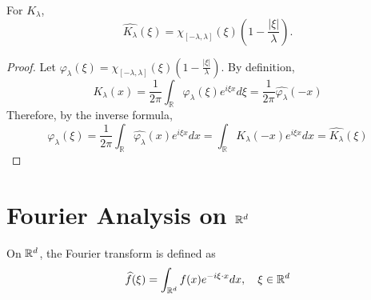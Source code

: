 \begin{enumerate}[label=\arabic*.]
	\begin{cor}
		For $K_\lambda$,
		\begin{equation*}
			\widehat{K_\lambda}(\xi)=\chi_{[-\lambda, \lambda]}(\xi)\left(1-\frac{|\xi|}{\lambda}\right) .
		\end{equation*}
	\end{cor}
	\begin{proof}
		Let $\varphi_\lambda(\xi) = \chi_{[-\lambda, \lambda]}(\xi)\left(1-\frac{|\xi|}{\lambda}\right)$. By definition, 
		\begin{equation*}
			K_\lambda(x)=\frac{1}{2 \pi} \int_{\mathbb{R}} \varphi_\lambda(\xi) e^{i \xi x} d \xi = \frac{1}{2 \pi} \widehat{\varphi_\lambda}(-x)
		\end{equation*}
		Therefore, by the inverse formula,
		\begin{equation*}
			\varphi_\lambda(\xi)=\frac{1}{2 \pi} \int_{\mathbb{R}} \widehat{\varphi_\lambda}(x) e^{i \xi x} d x=\int_{\mathbb{R}} K_\lambda(-x) e^{i \xi x} d x=\widehat{K_\lambda}(\xi)
		\end{equation*}
	\end{proof}
\end{enumerate}

\section{Fourier Analysis on \texorpdfstring{$\mathbb{R}^d$}{Rd}}

On $\mathbb{R}^d$, the Fourier transform is defined as
\begin{equation*}
	\widehat{f}(\xi) = \int_{\mathbb{R}^d}f(x)e^{-i\xi \cdot x}dx,\quad \xi \in \mathbb{R}^d
\end{equation*}


